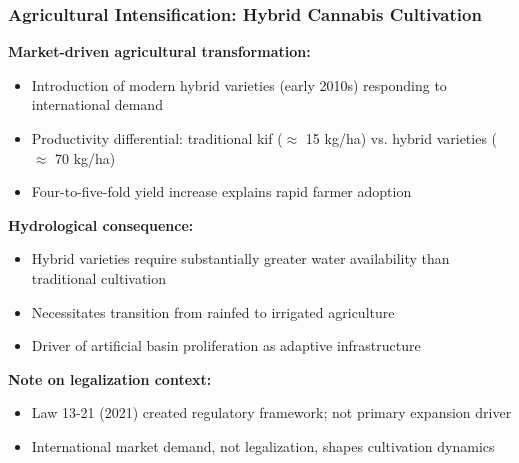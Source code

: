 \documentclass{beamer}
\begin{document}
\begin{frame}
\frametitle{Agricultural Intensification: Hybrid Cannabis Cultivation}

\textbf{Market-driven agricultural transformation:}
\begin{itemize}
  \item Introduction of modern hybrid varieties (early 2010s) responding to international demand
  \item Productivity differential: traditional kif ($\approx$ 15 kg/ha) vs. hybrid varieties ($\approx$ 70 kg/ha)
  \item Four-to-five-fold yield increase explains rapid farmer adoption
\end{itemize}

\vspace{0.3cm}

\textbf{Hydrological consequence:}
\begin{itemize}
  \item Hybrid varieties require substantially greater water availability than traditional cultivation
  \item Necessitates transition from rainfed to irrigated agriculture
  \item Driver of artificial basin proliferation as adaptive infrastructure
\end{itemize}

\vspace{0.3cm}

\textbf{Note on legalization context:}
\begin{itemize}
  \item Law 13-21 (2021) created regulatory framework; not primary expansion driver
  \item International market demand, not legalization, shapes cultivation dynamics
\end{itemize}

\end{frame}
\end{document}
